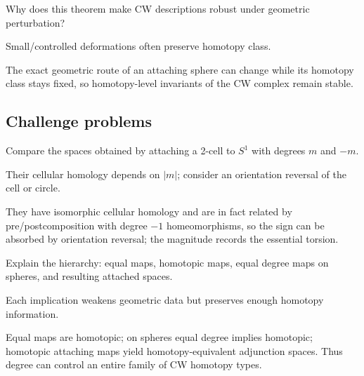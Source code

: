 \begin{exercise}\label{exr:viii08-ped-14}
Why does this theorem make CW descriptions robust under geometric perturbation?
\end{exercise}
\begin{hint}
Small/controlled deformations often preserve homotopy class.
\end{hint}
\begin{solution}
The exact geometric route of an attaching sphere can change while its homotopy class stays fixed, so homotopy-level invariants of the CW complex remain stable.
\end{solution}

\subsection*{Challenge problems}

\begin{exercise}\label{exr:viii08-ped-15}
Compare the spaces obtained by attaching a 2-cell to $S^1$ with degrees $m$ and $-m$.
\end{exercise}
\begin{hint}
Their cellular homology depends on $|m|$; consider an orientation reversal of the cell or circle.
\end{hint}
\begin{solution}
They have isomorphic cellular homology and are in fact related by pre/postcomposition with degree $-1$ homeomorphisms, so the sign can be absorbed by orientation reversal; the magnitude records the essential torsion.
\end{solution}

\begin{exercise}\label{exr:viii08-ped-16}
Explain the hierarchy: equal maps, homotopic maps, equal degree maps on spheres, and resulting attached spaces.
\end{exercise}
\begin{hint}
Each implication weakens geometric data but preserves enough homotopy information.
\end{hint}
\begin{solution}
Equal maps are homotopic; on spheres equal degree implies homotopic; homotopic attaching maps yield homotopy-equivalent adjunction spaces.  Thus degree can control an entire family of CW homotopy types.
\end{solution}

